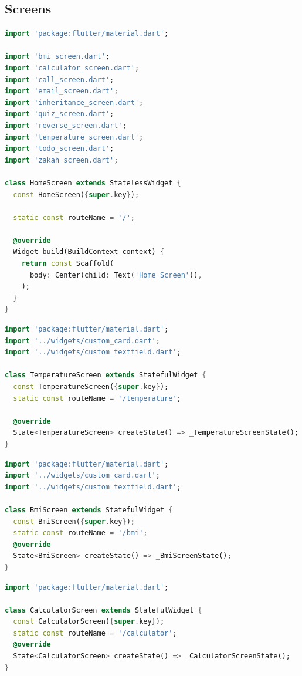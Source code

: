 \documentclass{article}
\begin{document}
\subsection*{Screens}
\begin{lstlisting}[language=Dart, caption={\texttt{\detokenize{lib/screens/home_screen.dart}}}]
import 'package:flutter/material.dart';

import 'bmi_screen.dart';
import 'calculator_screen.dart';
import 'call_screen.dart';
import 'email_screen.dart';
import 'inheritance_screen.dart';
import 'quiz_screen.dart';
import 'reverse_screen.dart';
import 'temperature_screen.dart';
import 'todo_screen.dart';
import 'zakah_screen.dart';

class HomeScreen extends StatelessWidget {
  const HomeScreen({super.key});

  static const routeName = '/';

  @override
  Widget build(BuildContext context) {
    return const Scaffold(
      body: Center(child: Text('Home Screen')),
    );
  }
}
\end{lstlisting}

\begin{lstlisting}[language=Dart, caption={\texttt{\detokenize{lib/screens/temperature_screen.dart}}}]
import 'package:flutter/material.dart';
import '../widgets/custom_card.dart';
import '../widgets/custom_textfield.dart';

class TemperatureScreen extends StatefulWidget {
  const TemperatureScreen({super.key});
  static const routeName = '/temperature';

  @override
  State<TemperatureScreen> createState() => _TemperatureScreenState();
}
\end{lstlisting}

\begin{lstlisting}[language=Dart, caption={\texttt{\detokenize{lib/screens/bmi_screen.dart}}}]
import 'package:flutter/material.dart';
import '../widgets/custom_card.dart';
import '../widgets/custom_textfield.dart';

class BmiScreen extends StatefulWidget {
  const BmiScreen({super.key});
  static const routeName = '/bmi';
  @override
  State<BmiScreen> createState() => _BmiScreenState();
}
\end{lstlisting}

\begin{lstlisting}[language=Dart, caption={\texttt{\detokenize{lib/screens/calculator_screen.dart}}}]
import 'package:flutter/material.dart';

class CalculatorScreen extends StatefulWidget {
  const CalculatorScreen({super.key});
  static const routeName = '/calculator';
  @override
  State<CalculatorScreen> createState() => _CalculatorScreenState();
}
\end{lstlisting}
\end{document}
